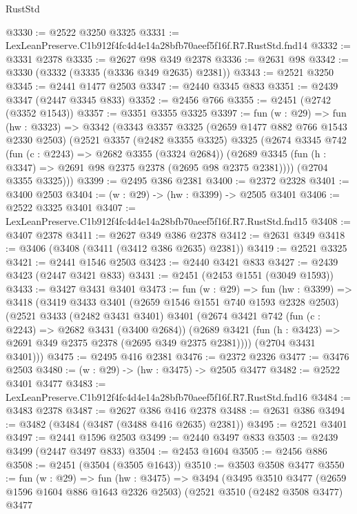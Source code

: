 \begin{lexlean}{RustStd}
\begin{coremodule}
@3330 := @2522 @3250 @3325
@3331 := LexLeanPreserve.C1b912f4fc4d4e14a28bfb70aeef5f16f.R7.RustStd.fnd14
@3332 := @3331 @2378
@3335 := @2627 @98 @349 @2378
@3336 := @2631 @98
@3342 := @3330 (@3332 (@3335 (@3336 @349 @2635) @2381))
@3343 := @2521 @3250
@3345 := @2441 @1477 @2503
@3347 := @2440 @3345 @833
@3351 := @2439 @3347 (@2447 @3345 @833)
@3352 := @2456 @766
@3355 := @2451 (@2742 (@3352 @1543))
@3357 := @3351 @3355 @3325
@3397 := fun (w : @29) =>
  fun (hw : @3323) =>
  @3342
    (@3343
      @3357
      @3325
      (@2659 @1477 @882 @766 @1543 @2330 @2503)
      (@2521
        @3357
        (@2482 @3355 @3325)
        @3325
        (@2674
          @3345
          @742
          (fun (c : @2243) => @2682 @3355 (@3324 @2684))
          (@2689 @3345 (fun (h : @3347) => @2691 @98 @2375 @2378 (@2695 @98 @2375 @2381))))
        (@2704 @3355 @3325)))
@3399 := @2495 @386 @2381
@3400 := @2372 @2328
@3401 := @3400 @2503
@3404 := (w : @29) -> (hw : @3399) -> @2505 @3401
@3406 := @2522 @3325 @3401
@3407 := LexLeanPreserve.C1b912f4fc4d4e14a28bfb70aeef5f16f.R7.RustStd.fnd15
@3408 := @3407 @2378
@3411 := @2627 @349 @386 @2378
@3412 := @2631 @349
@3418 := @3406 (@3408 (@3411 (@3412 @386 @2635) @2381))
@3419 := @2521 @3325
@3421 := @2441 @1546 @2503
@3423 := @2440 @3421 @833
@3427 := @2439 @3423 (@2447 @3421 @833)
@3431 := @2451 (@2453 @1551 (@3049 @1593))
@3433 := @3427 @3431 @3401
@3473 := fun (w : @29) =>
  fun (hw : @3399) =>
  @3418
    (@3419
      @3433
      @3401
      (@2659 @1546 @1551 @740 @1593 @2328 @2503)
      (@2521
        @3433
        (@2482 @3431 @3401)
        @3401
        (@2674
          @3421
          @742
          (fun (c : @2243) => @2682 @3431 (@3400 @2684))
          (@2689 @3421 (fun (h : @3423) => @2691 @349 @2375 @2378 (@2695 @349 @2375 @2381))))
        (@2704 @3431 @3401)))
@3475 := @2495 @416 @2381
@3476 := @2372 @2326
@3477 := @3476 @2503
@3480 := (w : @29) -> (hw : @3475) -> @2505 @3477
@3482 := @2522 @3401 @3477
@3483 := LexLeanPreserve.C1b912f4fc4d4e14a28bfb70aeef5f16f.R7.RustStd.fnd16
@3484 := @3483 @2378
@3487 := @2627 @386 @416 @2378
@3488 := @2631 @386
@3494 := @3482 (@3484 (@3487 (@3488 @416 @2635) @2381))
@3495 := @2521 @3401
@3497 := @2441 @1596 @2503
@3499 := @2440 @3497 @833
@3503 := @2439 @3499 (@2447 @3497 @833)
@3504 := @2453 @1604
@3505 := @2456 @886
@3508 := @2451 (@3504 (@3505 @1643))
@3510 := @3503 @3508 @3477
@3550 := fun (w : @29) =>
  fun (hw : @3475) =>
  @3494
    (@3495
      @3510
      @3477
      (@2659 @1596 @1604 @886 @1643 @2326 @2503)
      (@2521
        @3510
        (@2482 @3508 @3477)
        @3477

\end{coremodule}
\end{lexlean}
